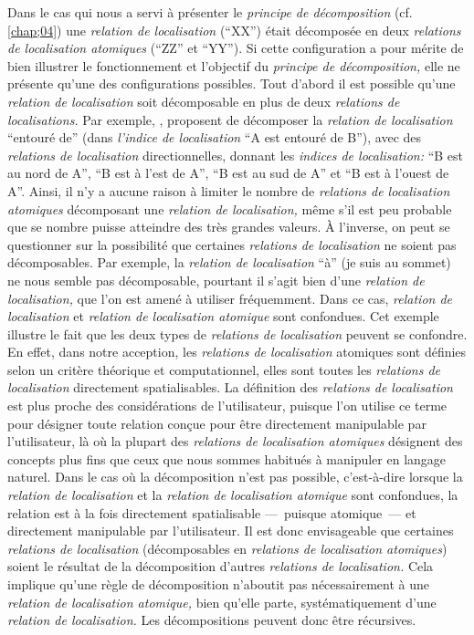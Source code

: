 Dans le cas qui nous a servi à présenter le \emph{principe de
  décomposition} (cf. \autoref{chap;04}) une \emph{relation de
  localisation} (\enquote{XX}) était décomposée en deux
\emph{relations de localisation atomiques} (\enquote{ZZ} et
\enquote{YY}). Si cette configuration a pour mérite de bien illustrer
le fonctionnement et l'objectif du \emph{principe de décomposition,}
elle ne présente qu'une des configurations possibles. Tout d'abord il
est possible qu'une \emph{relation de localisation} soit décomposable
en plus de deux \emph{relations de localisations.} Par exemple,
\textcite{Vanegas2011}, proposent de décomposer la \emph{relation de
  localisation} \enquote{entouré de} (dans \emph{l'indice de
  localisation} \enquote{A est entouré de B}), avec des
\emph{relations de localisation} directionnelles, donnant les
\emph{indices de localisation:} \enquote{B est au nord de A},
\enquote{B est à l'est de A}, \enquote{B est au sud de A} et
\enquote{B est à l'ouest de A}. Ainsi, il n'y a aucune raison à
limiter le nombre de \emph{relations de localisation atomiques}
décomposant une \emph{relation de localisation,} même s'il est peu
probable que se nombre puisse atteindre des très grandes valeurs. À
l'inverse, on peut se questionner sur la possibilité que certaines
\emph{relations de localisation} ne soient pas décomposables. Par
exemple, la \emph{relation de localisation} \enquote{à} (\eg je suis
au sommet) ne nous semble pas décomposable, pourtant il s'agit bien
d'une \emph{relation de localisation,} que l'on est amené à utiliser
fréquemment. Dans ce cas, \emph{relation de localisation} et
\emph{relation de localisation atomique} sont confondues. Cet exemple
illustre le fait que les deux types de \emph{relations de
  localisation} peuvent se confondre. En effet, dans notre acception,
les \emph{relations de localisation} atomiques sont définies selon un
critère théorique et computationnel, elles sont toutes les
\emph{relations de localisation} directement spatialisables. La
définition des \emph{relations de localisation} est plus proche des
considérations de l'utilisateur, puisque l'on utilise ce terme pour
désigner toute relation conçue pour être directement manipulable par
l'utilisateur, là où la plupart des \emph{relations de localisation
  atomiques} désignent des concepts plus fins que ceux que nous sommes
habitués à manipuler en langage naturel. Dans le cas où la
décomposition n'est pas possible, c'est-à-dire lorsque la
\emph{relation de localisation} et la \emph{relation de localisation
  atomique} sont confondues, la relation est à la fois directement
spatialisable ---~puisque atomique~--- et directement manipulable par
l'utilisateur. Il est donc envisageable que certaines \emph{relations
  de localisation} (décomposables en \emph{relations de localisation
  atomiques}) soient le résultat de la décomposition d'autres
\emph{relations de localisation.} Cela implique qu'une règle de
décomposition n’aboutit pas nécessairement à une \emph{relation de
  localisation atomique,} bien qu'elle parte, systématiquement d'une
\emph{relation de localisation.} Les décompositions peuvent donc être
récursives.

